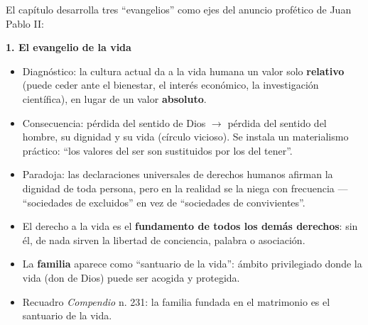 \documentclass[10pt,a4paper]{article}
\begin{document}
\noindent El capítulo desarrolla tres ``evangelios'' como ejes del anuncio profético de Juan Pablo II:\par\smallskip

\medskip\noindent \textbf{1. El evangelio de la vida}\par\nopagebreak
\begin{itemize}
\item Diagnóstico: la cultura actual da a la vida humana un valor solo \textbf{relativo} (puede ceder ante el bienestar, el interés económico, la investigación científica), en lugar de un valor \textbf{absoluto}.
\item Consecuencia: pérdida del sentido de Dios $\rightarrow$ pérdida del sentido del hombre, su dignidad y su vida (círculo vicioso). Se instala un materialismo práctico: ``los valores del ser son sustituidos por los del tener''.
\item Paradoja: las declaraciones universales de derechos humanos afirman la dignidad de toda persona, pero en la realidad se la niega con frecuencia --- ``sociedades de excluidos'' en vez de ``sociedades de convivientes''.
\item El derecho a la vida es el \textbf{fundamento de todos los demás derechos}: sin él, de nada sirven la libertad de conciencia, palabra o asociación.
\item La \textbf{familia} aparece como ``santuario de la vida'': ámbito privilegiado donde la vida (don de Dios) puede ser acogida y protegida.
\item Recuadro \textit{Compendio} n. 231: la familia fundada en el matrimonio es el santuario de la vida.
\end{itemize}
\end{document}
